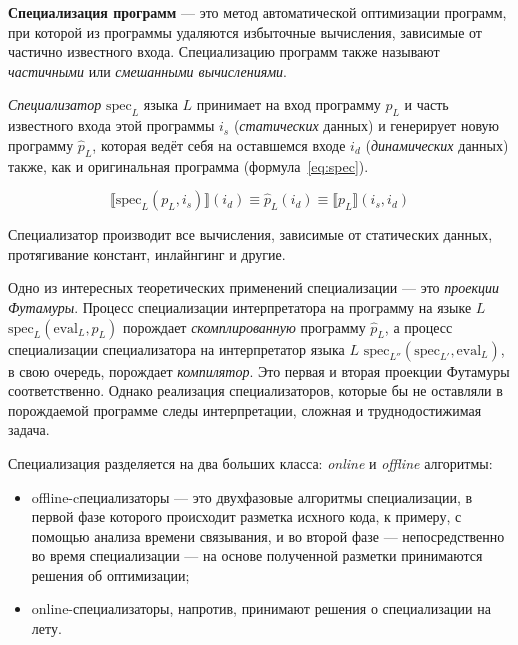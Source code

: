 {\bf Специализация программ} --- это метод автоматической оптимизации программ,
при которой из программы удаляются избыточные вычисления, зависимые от частично известного входа.
Специализацию программ также называют \emph{частичными} или \emph{смешанными вычислениями}\cite{jones}.

{\it Специализатор} $\text{spec}_L$ языка $L$ принимает на вход программу $p_L$ и часть известного входа этой
программы $i_s$ (\emph{статических} данных) и генерирует новую программу $\hat{p}_L$, которая ведёт себя на оставшемся
входе $i_d$ (\emph{динамических} данных) также, как и оригинальная программа (формула~\ref{eq:spec}).

\begin{equation}
  \llbracket \text{spec}_L(p_L, i_s) \rrbracket (i_d) \equiv \hat{p}_L (i_d) \equiv \llbracket p_L \rrbracket (i_s, i_d)
\label{eq:spec}
\end{equation}

Специализатор производит все вычисления, зависимые от статических данных,
протягивание констант, инлайнгинг и другие.


Одно из интересных теоретических применений специализации --- это \emph{проекции Футамуры}\cite{futamura}.
Процесс специализации интерпретатора на программу на языке $L$ $\text{spec}_L(\text{eval}_L, p_L)$
порождает \emph{скомплированную} программу $\hat{p}_L$, а процесс специализации специализатора
на интерпретатор языка $L$ $\text{spec}_{L''}(\text{spec}_{L'}, \text{eval}_L)$, в свою очередь,
порождает \emph{компилятор}. Это первая и вторая проекции Футамуры соответственно.
Однако реализация специализаторов, которые бы не оставляли в порождаемой программе
следы интерпретации, сложная и труднодостижимая задача\cite{jones}.

Специализация разделяется на два больших класса: \emph{online} и \emph{offline} алгоритмы:
\begin{itemize}
\item offline-cпециализаторы --- это двухфазовые алгоритмы специализации, в первой фазе
которого происходит разметка исхного кода, к примеру, с помощью анализа времени связывания\cite{jones},
и во второй фазе --- непосредственно во время специализации --- на основе полученной
разметки принимаются решения об оптимизации;
\item online-специализаторы, напротив, принимают решения о специализации на лету.
\end{itemize}


